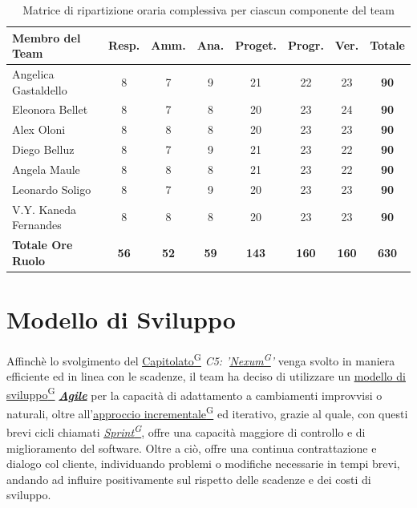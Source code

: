 \documentclass[a4paper,12pt]{article}
\providecommand{\glslink}[2]{\href{https://alittlebyte-19.github.io/Documentazione/glossario.html\#gls-#1}{\underline{#2}\textsuperscript{\scriptsize G}}}
\begin{document}
\begin{table}[H]
    \centering
    \renewcommand{\arraystretch}{1.5} 
    \begin{tabularx}{\textwidth}{|X|c|c|c|c|c|c|c|}
    \hline
    \textbf{Membro del Team} & \textbf{Resp.} & \textbf{Amm.} & \textbf{Ana.} & \textbf{Proget.} & \textbf{Progr.} & \textbf{Ver.} & \textbf{Totale} \\
    \hline
    Angelica Gastaldello & 8 & 7 & 9 & 21 & 22 & 23 & \textbf{90} \\
    \hline
    Eleonora Bellet & 8 & 7 & 8 & 20 & 23 & 24 & \textbf{90} \\
    \hline
    Alex Oloni & 8 & 8 & 8 & 20 & 23 & 23 & \textbf{90} \\
    \hline
    Diego Belluz & 8 & 7 & 9 & 21 & 23 & 22 & \textbf{90} \\
    \hline
    Angela Maule & 8 & 8 & 8 & 21 & 23 & 22 & \textbf{90} \\
    \hline
    Leonardo Soligo & 8 & 7 & 9 & 20 & 23 & 23 & \textbf{90} \\
    \hline
    V.Y. Kaneda Fernandes & 8 & 8 & 8 & 20 & 23 & 23 & \textbf{90} \\
    \hline
    \rowcolor{gray!20}
    \textbf{Totale Ore Ruolo} & \textbf{56} & \textbf{52} & \textbf{59} & \textbf{143} & \textbf{160} & \textbf{160} & \textbf{630} \\
    \hline
    \end{tabularx}
    \caption{Matrice di ripartizione oraria complessiva per ciascun componente del team}
    \label{tab:ripartizione_oraria_totale}
\end{table}
\newpage

\newpage

\section{Modello di Sviluppo}
\label{sec:modello_di_sviluppo}
Affinchè lo svolgimento del \glslink{capitolato}{Capitolato} \textit{C5: '\glslink{nexum}{Nexum}'} venga svolto in maniera efficiente ed in linea con le scadenze, il team ha deciso
di utilizzare un \glslink{modello-di-sviluppo}{modello di sviluppo} \href{https://agilemanifesto.org/}{\textbf{\textit{Agile}}} per la capacità di adattamento a cambiamenti improvvisi o naturali, oltre all'\glslink{approccio-incrementale}{approccio incrementale} ed iterativo, grazie al quale, con questi brevi cicli chiamati \textit{\glslink{sprint}{Sprint}},
offre una capacità maggiore di controllo e di miglioramento del software. Oltre a ciò, offre una continua contrattazione e dialogo col cliente, individuando problemi o modifiche necessarie in tempi brevi,
andando ad influire positivamente sul rispetto delle scadenze e dei costi di sviluppo.
\end{document}

